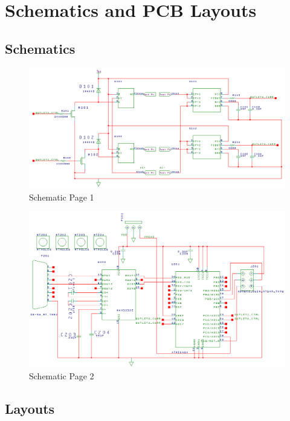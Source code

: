 \section{Schematics and PCB Layouts}
\subsection{\dxd Schematics}

\begin{figure}[H]
\centering
\includegraphics[width=1.0\textwidth,viewport=0 0 1041 491]{figures/schematic1.png}
\caption{\dxd Schematic Page 1}
\label{fig:schematic1}
\end{figure}

\begin{figure}[H]
\centering
\includegraphics[width=1.0\textwidth,viewport=0 0 1121 683]{figures/schematic2.png}
\caption{\dxd Schematic Page 2}
\label{fig:schematic2}
\end{figure}

\subsection{\pads Layouts}

